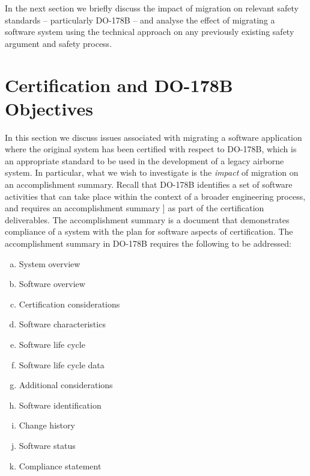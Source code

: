 \documentclass{llncs}
\begin{document}
In the next section we briefly discuss the impact of migration on relevant safety standards -- particularly DO-178B -- and analyse the effect of migrating
a software system using the technical approach on any previously existing safety argument and safety process.

\section{Certification and DO-178B Objectives}
In this section we discuss issues associated with migrating a software application where the original system has been certified with respect to DO-178B,
which is an appropriate standard to be used in the development of a legacy airborne system. In particular, what we wish to investigate is the \textit{impact}
of migration on an accomplishment summary. Recall that DO-178B identifies a set of software activities that can take place within the context of a broader 
engineering process, and requires an accomplishment summary \cite{DO178B}] as part of the certification deliverables. The accomplishment summary is a 
document that demonstrates compliance of a system with the plan for software aspects of certification. The accomplishment summary in
DO-178B requires the following to be addressed:

\begin{enumerate}[(a)]
\item System overview
\item Software overview
\item Certification considerations
\item Software characteristics
\item Software life cycle 
\item Software life cycle data
\item Additional considerations
\item Software identification
\item Change history
\item Software status
\item Compliance statement
\end{enumerate}
\end{document}
